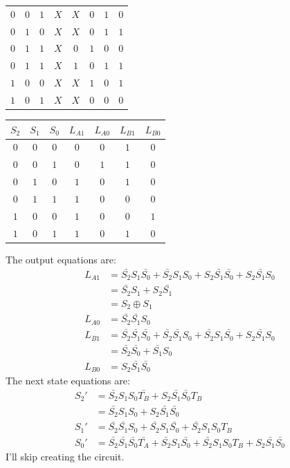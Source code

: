 \documentclass[12pt]{article}
\newenvironment{sol}[1][Solution]{\begin{trivlist}
		\item[\hskip \labelsep {\bfseries #1:}]}{\end{trivlist}}
\begin{document}
\begin{sol}
\begin{center}
\begin{tabular}{ccc|cc|ccc}
			$0$ & $0$ & $1$ & $X$ & $X$ & $0$ & $1$ & $0$\\
			$0$ & $1$ & $0$ & $X$ & $X$ & $0$ & $1$ & $1$\\
			$0$ & $1$ & $1$ & $X$ & $0$ & $1$ & $0$ & $0$\\
			$0$ & $1$ & $1$ & $X$ & $1$ & $0$ & $1$ & $1$\\
			$1$ & $0$ & $0$ & $X$ & $X$ & $1$ & $0$ & $1$\\
			$1$ & $0$ & $1$ & $X$ & $X$ & $0$ & $0$ & $0$\\
		\end{tabular}
		\quad
		\begin{tabular}{ccc|cccc}
			$S_2$ & $S_1$ & $S_0$ & $L_{A1}$ & $L_{A0}$ & $L_{B1}$ & $L_{B0}$\\
			\hline
			$0$ & $0$ & $0$ & $0$ & $0$ & $1$ & $0$\\
			$0$ & $0$ & $1$ & $0$ & $1$ & $1$ & $0$\\
			$0$ & $1$ & $0$ & $1$ & $0$ & $1$ & $0$\\
			$0$ & $1$ & $1$ & $1$ & $0$ & $0$ & $0$\\
			$1$ & $0$ & $0$ & $1$ & $0$ & $0$ & $1$\\
			$1$ & $0$ & $1$ & $1$ & $0$ & $1$ & $0$\\
		\end{tabular}
	\end{center}
	The output equations are:
	\begin{align*}
		L_{A1}&=\bar{S_2}S_1\bar{S_0}+\bar{S_2}S_1S_0+S_2\bar{S_1}\bar{S_0}+S_2\bar{S_1}S_0\\
		&=\bar{S_2}S_1+S_2\bar{S_1}\\
		&=S_2\oplus S_1\\
		L_{A0}&=\bar{S_2}\bar{S_1}S_0\\
		L_{B1}&=\bar{S_2}\bar{S_1}\bar{S_0}+\bar{S_2}\bar{S_1}S_0
		+\bar{S_2}S_1\bar{S_0}+S_2\bar{S_1}S_0\\
		&=\bar{S_2}\bar{S_0}+\bar{S_1}S_0\\
		L_{B0}&=S_2\bar{S_1}\bar{S_0}
	\end{align*}
	The next state equations are:
	\begin{align*}
		S_{2}'&=\bar{S_2}S_1S_0\bar{T_B}+S_2\bar{S_1}\bar{S_0}T_B\\
		&=\bar{S_2}S_1S_0+S_2\bar{S_1}\bar{S_0}\\
		S_{1}'&=\bar{S_2}\bar{S_1}S_0
		+\bar{S_2}S_1\bar{S_0}
		+\bar{S_2}S_1S_0T_B\\
		S_{0}'&=\bar{S_2}\bar{S_1}\bar{S_0}\bar{T_A}+\bar{S_2}S_1\bar{S_0}
		+\bar{S_2}S_1S_0T_B+S_2\bar{S_1}\bar{S_0}		
	\end{align*}
	I'll skip creating the circuit.
\end{sol}
\end{document}
